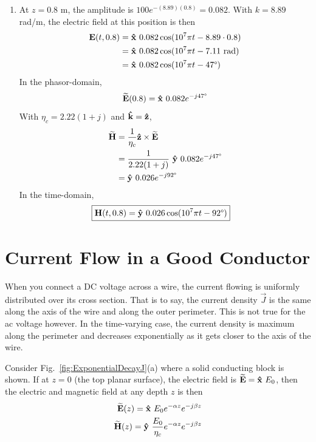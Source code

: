 \begin{example}
\begin{enumerate}[label=(\alph*), itemsep=0pt]
        \item At $z=0.8$ m, the amplitude is $100 e^{-(8.89)(0.8)} = 0.082$. With $k = 8.89$ rad/m, the electric field at this position is then 
        \begin{align*}
            \boldsymbol{\mathrm{E}}(t,0.8) &= \boldsymbol{{\mathrm{\hat{x}}}}\ 0.082 \cos(10^7 \pi t - 8.89 \cdot 0.8) \\ 
            &= \boldsymbol{{\mathrm{\hat{x}}}}\ 0.082 \cos(10^7\pi t - 7.11\ \text{rad}) \\ 
            &= \boldsymbol{{\mathrm{\hat{x}}}}\ 0.082 \cos(10^7\pi t - 47\degree) 
        \end{align*}
        In the phasor-domain, 
        \begin{equation*}
            \boldsymbol{\mathrm{\widetilde{E}}}(0.8) = \boldsymbol{{\mathrm{\hat{x}}}} \ 0.082 e^{-j 47\degree}
        \end{equation*}
        With $\eta_c = 2.22(1+j)$ and $\boldsymbol{{\mathrm{\hat{k}}}}=\boldsymbol{{\mathrm{\hat{z}}}}$, 
        \begin{align*}
            \boldsymbol{\mathrm{\widetilde{H}}} &= \dfrac{1}{\eta_c} \boldsymbol{{\mathrm{\hat{z}}}} \times \boldsymbol{\mathrm{\widetilde{E}}} \\ 
            &= \dfrac{1}{2.22(1+j)} \ \boldsymbol{{\mathrm{\hat{y}}}} \ 0.082 e^{-j47\degree} \\
           &= \boldsymbol{{\mathrm{\hat{y}}}}\ 0.026 e^{-j92\degree}
        \end{align*}
        In the time-domain, 
        \begin{align*}
            \Aboxed{\vec{H}(t,0.8) &= \uvec{y}\ 0.026 \cos(10^7\pi t - 92\degree)}
        \end{align*}
    \end{enumerate}
\end{example} 

\section{Current Flow in a Good Conductor}
When you connect a DC voltage across a wire, the current flowing is uniformly distributed over its cross section. That is to say, the current density $\vec{J}$ is the same along the axis of the wire and along the outer perimeter. This is not true for the ac voltage however. In the time-varying case, the current density is maximum along the perimeter and decreases exponentially as it gets closer to the axis of the wire. \par 

Consider Fig.\ \ref{fig:ExponentialDecayJ}(a) where a solid conducting block is shown. If at $z=0$ (the top planar surface), the electric field is $\boldsymbol{\mathrm{\widetilde{E}}} = \boldsymbol{{\mathrm{\hat{x}}}}\ E_0$, then the electric and magnetic field at any depth $z$ is then 
\begin{align}
    \boldsymbol{\mathrm{\widetilde{E}}}(z) = \boldsymbol{{\mathrm{\hat{x}}}}\ E_0 e^{-\alpha z} e^{-j\beta z} \\ 
    \boldsymbol{\mathrm{\widetilde{H}}}(z) = \boldsymbol{{\mathrm{\hat{y}}}}\ \dfrac{E_0}{\eta_c} e^{-\alpha z} e^{-j\beta z}
\end{align}


